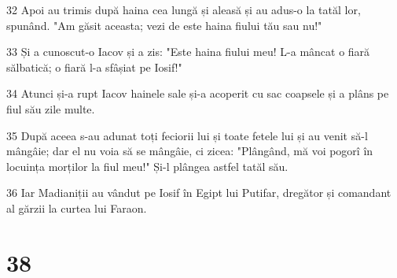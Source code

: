 \par 32 Apoi au trimis după haina cea lungă și aleasă și au adus-o la tatăl lor, spunând. "Am găsit aceasta; vezi de este haina fiului tău sau nu!"
\par 33 Și a cunoscut-o Iacov și a zis: "Este haina fiului meu! L-a mâncat o fiară sălbatică; o fiară l-a sfâșiat pe Iosif!"
\par 34 Atunci și-a rupt Iacov hainele sale și-a acoperit cu sac coapsele și a plâns pe fiul său zile multe.
\par 35 După aceea s-au adunat toți feciorii lui și toate fetele lui și au venit să-l mângâie; dar el nu voia să se mângâie, ci zicea: "Plângând, mă voi pogorî în locuința morților la fiul meu!" Și-l plângea astfel tatăl său.
\par 36 Iar Madianiții au vândut pe Iosif în Egipt lui Putifar, dregător și comandant al gărzii la curtea lui Faraon.

\chapter{38}

